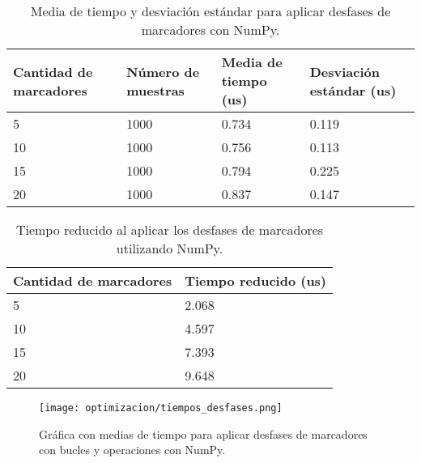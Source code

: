 \begin{table}[H]
	\centering
	\resizebox{\textwidth}{!} {
	\begin{tabular}{|l|l|l|l|}
		\hline
		\textbf{Cantidad de marcadores} & \textbf{Número de muestras} & \textbf{Media de tiempo (us)} & \textbf{Desviación estándar (us)} \\ \hline
		5                               & 1000                        & 0.734                         & 0.119                             \\ \hline
		10                              & 1000                        & 0.756                         & 0.113                             \\ \hline
		15                              & 1000                        & 0.794                         & 0.225                             \\ \hline
		20                              & 1000                        & 0.837                         & 0.147                             \\ \hline
	\end{tabular}}
	\caption{Media de tiempo y desviación estándar para aplicar desfases de marcadores con NumPy.}
	\label{cuadro:tiempos_desfases_numpy}
\end{table}

\begin{table}[H]
	\centering
	\resizebox{0.5\textwidth}{!} {
	\begin{tabular}{|l|l|}
		\hline
		\textbf{Cantidad de marcadores} & \textbf{Tiempo reducido (us)} \\ \hline
		5                               & 2.068                         \\ \hline
		10                              & 4.597                         \\ \hline
		15                              & 7.393                         \\ \hline
		20                              & 9.648                         \\ \hline
	\end{tabular}}
	\caption{Tiempo reducido al aplicar los desfases de marcadores utilizando NumPy.}
	\label{cuadro:tiempo_reducido_desfases}
\end{table}

\begin{figure}[H]
	\centering
	\texttt{[image: optimizacion/tiempos\_desfases.png]}
	\caption{Gráfica con medias de tiempo para aplicar desfases de marcadores con bucles y operaciones con NumPy.}
	\label{fig:grafica_tiempos_desfases}
\end{figure}

